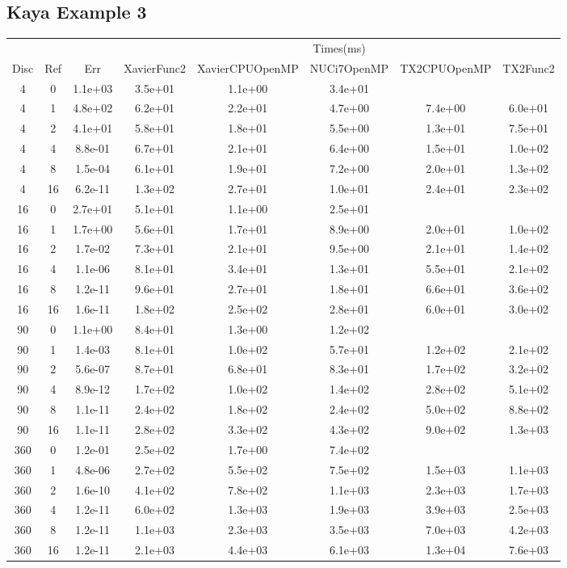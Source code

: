 \begin{landscape}
\subsection{Kaya Example 3}
\begin{center}
\begin{tabular}{c|c|c|c|c|c|c|c}
	&&&\multicolumn{5}{c}{Times(ms)}\\
	Disc&Ref&Err&XavierFunc2&XavierCPUOpenMP&NUCi7OpenMP&TX2CPUOpenMP&TX2Func2\\
\hline
4&0&1.1e+03&3.5e+01&1.1e+00&3.4e+01\\
4&1&4.8e+02&6.2e+01&2.2e+01&4.7e+00&7.4e+00&6.0e+01\\
4&2&4.1e+01&5.8e+01&1.8e+01&5.5e+00&1.3e+01&7.5e+01\\
4&4&8.8e-01&6.7e+01&2.1e+01&6.4e+00&1.5e+01&1.0e+02\\
4&8&1.5e-04&6.1e+01&1.9e+01&7.2e+00&2.0e+01&1.3e+02\\
4&16&6.2e-11&1.3e+02&2.7e+01&1.0e+01&2.4e+01&2.3e+02\\
\hline
16&0&2.7e+01&5.1e+01&1.1e+00&2.5e+01\\
16&1&1.7e+00&5.6e+01&1.7e+01&8.9e+00&2.0e+01&1.0e+02\\
16&2&1.7e-02&7.3e+01&2.1e+01&9.5e+00&2.1e+01&1.4e+02\\
16&4&1.1e-06&8.1e+01&3.4e+01&1.3e+01&5.5e+01&2.1e+02\\
16&8&1.2e-11&9.6e+01&2.7e+01&1.8e+01&6.6e+01&3.6e+02\\
16&16&1.6e-11&1.8e+02&2.5e+02&2.8e+01&6.0e+01&3.0e+02\\
\hline
90&0&1.1e+00&8.4e+01&1.3e+00&1.2e+02\\
90&1&1.4e-03&8.1e+01&1.0e+02&5.7e+01&1.2e+02&2.1e+02\\
90&2&5.6e-07&8.7e+01&6.8e+01&8.3e+01&1.7e+02&3.2e+02\\
90&4&8.9e-12&1.7e+02&1.0e+02&1.4e+02&2.8e+02&5.1e+02\\
90&8&1.1e-11&2.4e+02&1.8e+02&2.4e+02&5.0e+02&8.8e+02\\
90&16&1.1e-11&2.8e+02&3.3e+02&4.3e+02&9.0e+02&1.3e+03\\
\hline
360&0&1.2e-01&2.5e+02&1.7e+00&7.4e+02\\
360&1&4.8e-06&2.7e+02&5.5e+02&7.5e+02&1.5e+03&1.1e+03\\
360&2&1.6e-10&4.1e+02&7.8e+02&1.1e+03&2.3e+03&1.7e+03\\
360&4&1.2e-11&6.0e+02&1.3e+03&1.9e+03&3.9e+03&2.5e+03\\
360&8&1.2e-11&1.1e+03&2.3e+03&3.5e+03&7.0e+03&4.2e+03\\
360&16&1.2e-11&2.1e+03&4.4e+03&6.1e+03&1.3e+04&7.6e+03\\
\hline
\end{tabular}
\end{center}
\end{landscape}





